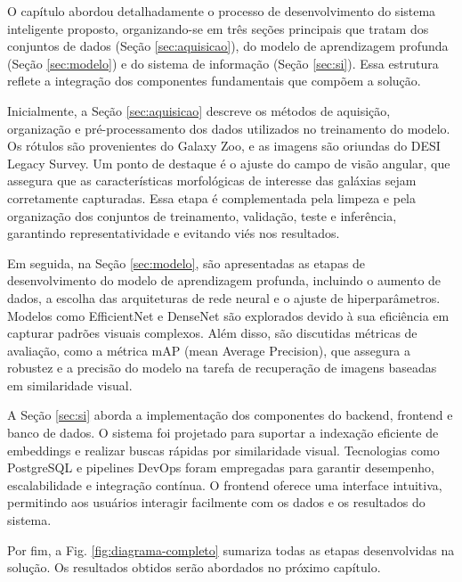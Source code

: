 O capítulo abordou detalhadamente o processo de desenvolvimento do sistema inteligente proposto, organizando-se em três seções principais que tratam dos conjuntos de dados (Seção \ref{sec:aquisicao}), do modelo de aprendizagem profunda (Seção \ref{sec:modelo}) e do sistema de informação (Seção \ref{sec:si}). Essa estrutura reflete a integração dos componentes fundamentais que compõem a solução.

Inicialmente, a Seção \ref{sec:aquisicao} descreve os métodos de aquisição, organização e pré-processamento dos dados utilizados no treinamento do modelo. Os rótulos são provenientes do Galaxy Zoo, e as imagens são oriundas do DESI Legacy Survey. Um ponto de destaque é o ajuste do campo de visão angular, que assegura que as características morfológicas de interesse das galáxias sejam corretamente capturadas. Essa etapa é complementada pela limpeza e pela organização dos conjuntos de treinamento, validação, teste e inferência, garantindo representatividade e evitando viés nos resultados.

Em seguida, na Seção \ref{sec:modelo}, são apresentadas as etapas de desenvolvimento do modelo de aprendizagem profunda, incluindo o aumento de dados, a escolha das arquiteturas de rede neural e o ajuste de hiperparâmetros. Modelos como EfficientNet e DenseNet são explorados devido à sua eficiência em capturar padrões visuais complexos. Além disso, são discutidas métricas de avaliação, como a métrica mAP (mean Average Precision), que assegura a robustez e a precisão do modelo na tarefa de recuperação de imagens baseadas em similaridade visual.

A Seção \ref{sec:si} aborda a implementação dos componentes do backend, frontend e banco de dados. O sistema foi projetado para suportar a indexação eficiente de embeddings e realizar buscas rápidas por similaridade visual. Tecnologias como PostgreSQL e pipelines DevOps foram empregadas para garantir desempenho, escalabilidade e integração contínua. O frontend oferece uma interface intuitiva, permitindo aos usuários interagir facilmente com os dados e os resultados do sistema.

Por fim, a Fig. \ref{fig:diagrama-completo} sumariza todas as etapas desenvolvidas na solução. Os resultados obtidos serão abordados no próximo capítulo.

